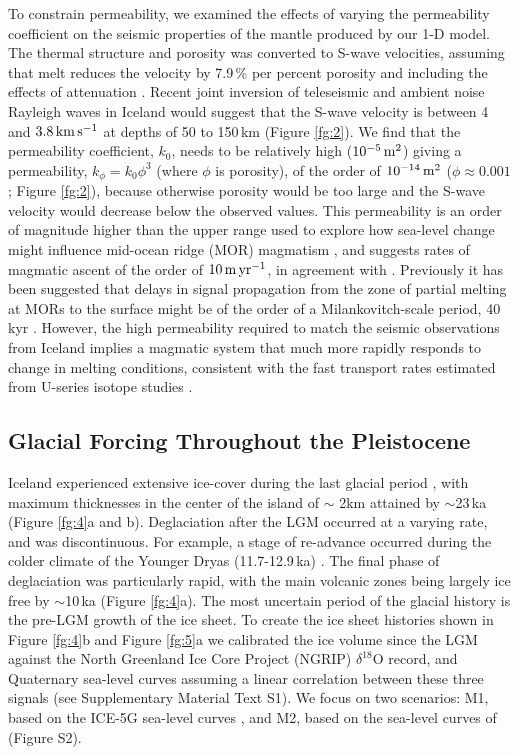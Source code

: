 \documentclass[draft,linenumbers]{agujournal2018}
\begin{document}
To constrain permeability, we examined the effects of varying the permeability coefficient on the seismic properties of the mantle produced by our 1-D model. The thermal structure and porosity was converted to S-wave velocities, assuming that melt reduces the velocity by 7.9\,\% per percent porosity \citep{hammond-2000} and including the effects of attenuation \citep{goes-etal-2012}. Recent joint inversion of teleseismic and ambient noise Rayleigh waves in Iceland would suggest that the S-wave velocity is between 4 and $3.8\rm\,km\,s^{-1}$ at depths of 50 to 150\,km \citep{harmon-2016} (Figure \ref{fg:2}). We find that the permeability coefficient, $k_{0}$, needs to be relatively high ($10^{-5}\rm\,m^{2}$) giving a permeability, $k_{\phi} = k_{0}\phi^{3}$ (where $\phi$ is porosity), of the order of $10^{-14}\rm\,m^{2}$ ($\phi \approx 0.001$; Figure \ref{fg:2}), because otherwise porosity would be too large and the S-wave velocity would decrease below the observed values. This permeability is an order of magnitude higher than the upper range used to explore how sea-level change might influence mid-ocean ridge (MOR) magmatism \citep{crowley-etal-2015,burley-2015}, and suggests rates of magmatic ascent of the order of $10\rm\,m\,yr^{-1}$, in agreement with \cite{maclennan-etal-2002}. Previously it has been suggested that delays in signal propagation from the zone of partial melting at MORs to the surface might be of the order of a Milankovitch-scale period, 40\,kyr \citep{huybers-2017}. However, the high permeability required to match the seismic observations from Iceland implies a magmatic system that much more rapidly responds to change in melting conditions, consistent with the fast transport rates estimated from U-series isotope studies \citep{elliot-2014}.

\subsection{Glacial Forcing Throughout the Pleistocene}

Iceland experienced extensive ice-cover during the last glacial period \citep{patton-etal-2017}, with maximum thicknesses in the center of the island of $\sim$ 2km attained by $\sim$23\,ka (Figure \ref{fg:4}a and b). Deglaciation after the LGM occurred at a varying rate, and was discontinuous. For example, a stage of re-advance occurred during the colder climate of the Younger Dryas (11.7-12.9\,ka) \citep{nordahl-2015}. The final phase of deglaciation was particularly rapid, with the main volcanic zones being largely ice free by $\sim$10\,ka (Figure \ref{fg:4}a). The most uncertain period of the glacial history is the pre-LGM growth of the ice sheet. To create the ice sheet histories shown in Figure \ref{fg:4}b and Figure \ref{fg:5}a we calibrated the ice volume since the LGM against the North Greenland Ice Core Project (NGRIP) $\delta^{18}$O record, and Quaternary sea-level curves assuming a linear correlation between these three signals (see Supplementary Material Text S1). We focus on two scenarios: M1, based on the ICE-5G sea-level curves \citep{peltier-2004}, and M2, based on the sea-level curves of \citet{pico-etal-2017} (Figure S2).
\end{document}
